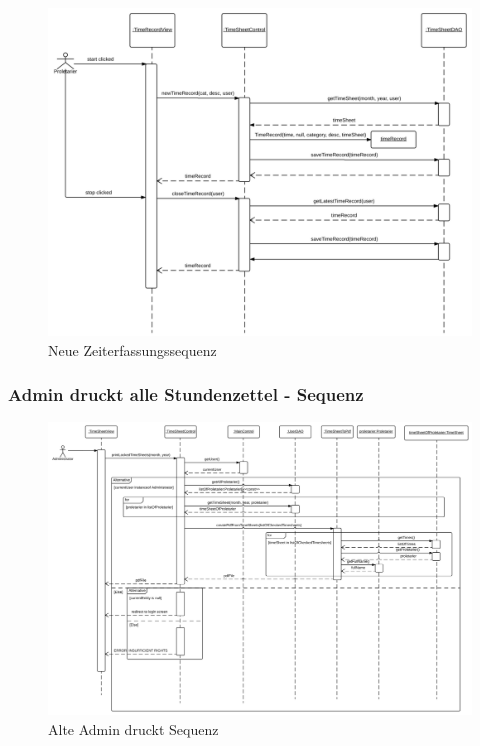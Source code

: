     \begin{figure}[H]
      \centering
        \includegraphics[scale=0.1]{new-Time-record-new.pdf}
       \caption{Neue Zeiterfassungssequenz}
    \end{figure}

    \newpage
\subsubsection{Admin druckt alle Stundenzettel - Sequenz}
    \begin{figure}[H]
      \centering
        \includegraphics[scale=0.1]{Admin-prints-all-timesheets.pdf}
       \caption{Alte Admin druckt Sequenz}
    \end{figure}

